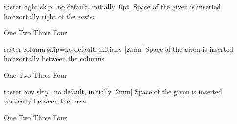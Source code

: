 \begin{docTcbKey}[][doc new=2014-11-10]{raster right skip}{=}{no default, initially |0pt|}
  Space of the given  is inserted horizontally right of the \emph{raster}.
\begin{dispExample}
\begin{tcbitemize}[raster right skip=2cm,
  size=small,colframe=red!50!black,colback=red!10!white]
  \tcbitem One
  \tcbitem Two
  \tcbitem Three
  \tcbitem Four
\end{tcbitemize}
\end{dispExample}
\end{docTcbKey}

\enlargethispage*{1cm}

\begin{docTcbKey}[][doc new=2014-11-10]{raster column skip}{=}{no default, initially |2mm|}
 Space of the given  is inserted horizontally between the columns.
\begin{dispExample}
\begin{tcbitemize}[raster column skip=2cm,
  size=small,colframe=red!50!black,colback=red!10!white]
  \tcbitem One
  \tcbitem Two
  \tcbitem Three
  \tcbitem Four
\end{tcbitemize}
\end{dispExample}
\end{docTcbKey}

\begin{docTcbKey}[][doc new=2014-11-10]{raster row skip}{=}{no default, initially |2mm|}
 Space of the given  is inserted vertically between the rows.
\begin{dispExample}
\begin{tcbitemize}[raster row skip=0pt,
  size=small,colframe=red!50!black,colback=red!10!white]
  \tcbitem One
  \tcbitem Two
  \tcbitem Three
  \tcbitem Four
\end{tcbitemize}
\end{dispExample}
\end{docTcbKey}

\clearpage

